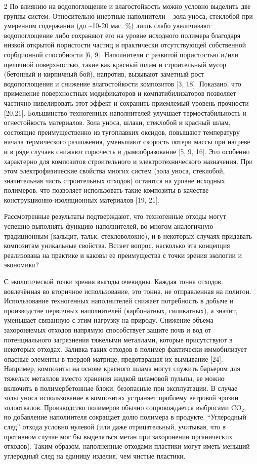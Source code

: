 \begin{multicols}{2}
По влиянию на водопоглощение и влагостойкость можно условно выделить две
группы систем. Относительно инертные наполнители -- зола уноса,
стеклобой при умеренном содержании (до \textasciitilde10-20 мас. \%)
лишь слабо увеличивают водопоглощение либо сохраняют его на уровне
исходного полимера благодаря низкой открытой пористости частиц и
практически отсутствующей собственной сорбционной способности {[}6,
9{]}. Наполнители с развитой пористостью и/или щелочной поверхностью,
такие как красный шлам и строительный мусор (бетонный и кирпичный бой),
напротив, вызывают заметный рост водопоглощения и снижение
влагостойкости композитов {[}3, 18{]}. Показано, что применение
поверхностных модификаторов и компатибилизаторов позволяет частично
нивелировать этот эффект и сохранить приемлемый уровень прочности
{[}20,21{]}. Большинство техногенных наполнителей улучшает
термостабильность и огнестойкость материалов. Зола уноса, шлаки,
стеклобой и красный шлам, состоящие преимущественно из тугоплавких
оксидов, повышают температуру начала термического разложения, уменьшают
скорость потери массы при нагреве и в ряде случаев снижают горючесть и
дымообразование {[}5, 9, 16{]}. Это особенно характерно для композитов
строительного и электротехнического назначения. При этом
электрофизические свойства многих систем (зола уноса, стеклобой,
значительная часть строительных отходов) остаются на уровне исходных
полимеров, что позволяет использовать такие композиты в качестве
конструкционно-изоляционных материалов {[}19, 21{]}.

Рассмотренные результаты подтверждают, что техногенные отходы могут
успешно выполнять функцию наполнителей, во многом аналогичную
традиционным (кальцит, тальк, стекловолокно), и в некоторых случаях
придавать композитам уникальные свойства. Встает вопрос, насколько эта
концепция реализована на практике и каковы ее преимущества с точки
зрения экологии и экономики?

С экологической точки зрения выгоды очевидны. Каждая тонна отходов,
вовлечённая во вторичное использование, это тонна, не отправленная на
полигон. Использование техногенных наполнителей снижает потребность в
добыче и производстве первичных наполнителей (карбонатных, силикатных),
а значит, уменьшает связанную с этим нагрузку на природу. Снижение
объема захороняемых отходов напрямую способствует защите почв и вод от
потенциального загрязнения тяжелыми металлами, которые присутствуют в
некоторых отходах. Заливка таких отходов в полимер фактически
иммобилизует опасные элементы в твердой матрице, предотвращая их
вымывание {[}24{]}. Например, композиты на основе красного шлама могут
служить барьером для тяжелых металлов вместо хранения жидкой шламовой
пульпы, ее можно включить в полимербетонные блоки, безопасные при
эксплуатации. В случае золы уноса использование в композитах устраняет
проблему ветровой эрозии золоотвалов. Производство полимеров обычно
сопровождается выбросами CO₂, но добавление наполнителя сокращает долю
полимера в продукте. ``Углеродный след'' отхода условно нулевой (или
даже отрицательный, учитывая, что в противном случае мог бы выделяться
метан при захоронении органических отходов). Таким образом, наполненные
отходами пластики могут иметь меньший углеродный след на единицу
изделия, чем чистые пластики.


\end{multicols}
